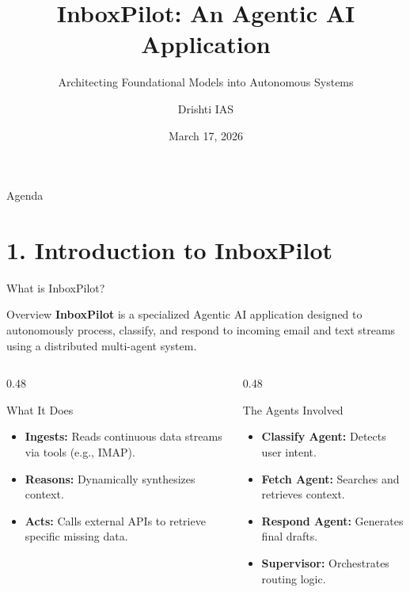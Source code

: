 \documentclass[aspectratio=169, xcolor=table]{beamer}
\title[InboxPilot]{InboxPilot: An Agentic AI Application}
\subtitle{Architecting Foundational Models into Autonomous Systems}
\author[Drishti IAS]{Drishti IAS}
\date{March 17, 2026}
\begin{document}
\begin{frame}[plain]
    \titlepage
\end{frame}

\begin{frame}{Agenda}
    \tableofcontents
\end{frame}

\section{1. Introduction to InboxPilot}

\begin{frame}{What is InboxPilot?}
    \begin{block}{Overview}
        \textbf{InboxPilot} is a specialized Agentic AI application designed to autonomously process, classify, and respond to incoming email and text streams using a distributed multi-agent system.
    \end{block}
    
    \vspace{0.3cm}
    \begin{columns}[T]
        \begin{column}{0.48\textwidth}
            \begin{block}{What It Does}
                \begin{itemize}
                    \item \textbf{Ingests:} Reads continuous data streams via tools (e.g., IMAP).
                    \item \textbf{Reasons:} Dynamically synthesizes context.
                    \item \textbf{Acts:} Calls external APIs to retrieve specific missing data.
                \end{itemize}
            \end{block}
        \end{column}
        
        \begin{column}{0.48\textwidth}
            \begin{block}{The Agents Involved}
                \begin{itemize}
                    \item \textbf{Classify Agent:} Detects user intent.
                    \item \textbf{Fetch Agent:} Searches and retrieves context.
                    \item \textbf{Respond Agent:} Generates final drafts.
                    \item \textbf{Supervisor:} Orchestrates routing logic.
                \end{itemize}
            \end{block}
        \end{column}
    \end{columns}
\end{frame}
\end{document}
